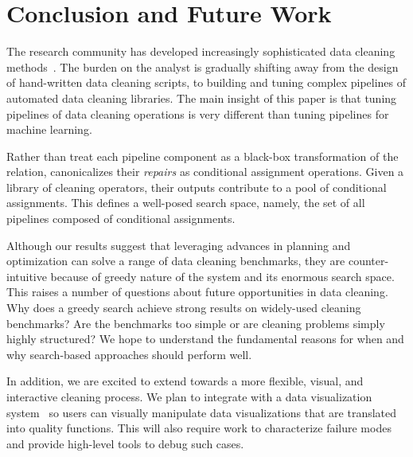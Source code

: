 \section{Conclusion and Future Work}
The research community has developed increasingly sophisticated data cleaning methods~\cite{dc, rekatsinas2017holoclean, DBLP:journals/pvldb/KrishnanWWFG16, DBLP:conf/sigmod/ChuIKW16, mudgal2018deep, doan2018toward}.
The burden on the analyst is gradually shifting away from the design of hand-written data cleaning scripts, to building and tuning complex pipelines of automated data cleaning libraries.
The main insight of this paper is that tuning pipelines of data cleaning operations is very different than tuning pipelines for machine learning.

Rather than treat each pipeline component as a black-box transformation of the relation, \sys canonicalizes their {\it  repairs} as conditional assignment operations.   Given a library of  cleaning operators, their outputs contribute to a pool of conditional assignments. This defines a well-posed search space, namely, the set of all pipelines composed of conditional assignments.  %
  
Although our results suggest that leveraging advances in planning and optimization can solve a range of data cleaning benchmarks, they are counter-intuitive because of greedy nature of the system and its enormous search space.  This raises a number of questions about future opportunities in data cleaning.  Why does a greedy search achieve strong results on widely-used cleaning benchmarks? Are the benchmarks too simple or are cleaning problems simply highly structured?  We hope to understand the fundamental reasons for when and why search-based approaches should perform well.

In addition, we are excited to extend \sys towards a more flexible, visual, and interactive cleaning process.  We plan to integrate \sys with a data visualization system~\cite{Wu2017CombiningDA} so users can visually manipulate data visualizations that are translated into quality functions.  This will also require work to characterize failure modes and provide high-level tools to debug such cases.  



